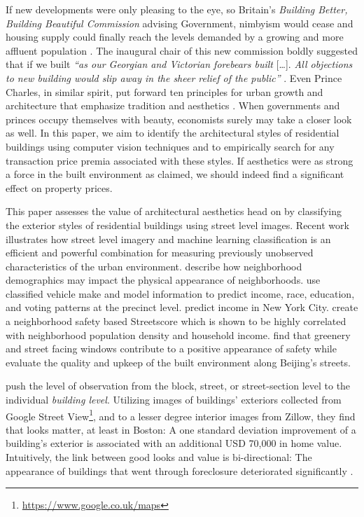 \documentclass[]{article}
\begin{document}
If new developments were only pleasing to the eye, so Britain's
\emph{Building Better, Building Beautiful Commission} advising
Government, nimbyism would cease and housing supply could finally reach
the levels demanded by a growing and more affluent population
\autocite{economistlineofbeauty2018}. The inaugural chair of this new
commission boldly suggested that if we built \emph{``as our Georgian and
Victorian forebears built} {[}\ldots{}{]}. \emph{All objections to new
building would slip away in the sheer relief of the public''}
\autocite{scruton2018}. Even Prince Charles, in similar spirit, put
forward ten principles for urban growth and architecture that emphasize
tradition and aesthetics \autocite{princecharles2014}. When governments
and princes occupy themselves with beauty, economists surely may take a
closer look as well. In this paper, we aim to identify the architectural
styles of residential buildings using computer vision techniques and to
empirically search for any transaction price premia associated with
these styles. If aesthetics were as strong a force in the built
environment as claimed, we should indeed find a significant effect on
property prices.

This paper assesses the value of architectural aesthetics head on by
classifying the exterior styles of residential buildings using street
level images. Recent work illustrates how street level imagery and
machine learning classification is an efficient and powerful combination
for measuring previously unobserved characteristics of the urban
environment. \textcite{Naik2017} describe how neighborhood demographics
may impact the physical appearance of neighborhoods.
\textcite{Gebru2017} use classified vehicle make and model information
to predict income, race, education, and voting patterns at the precinct
level. \textcite{Glaeser2016} predict income in New York City.
\textcite{Naik2016AER} create a neighborhood safety based Streetscore
which is shown to be highly correlated with neighborhood population
density and household income. \textcite{Nadai2016} find that greenery
and street facing windows contribute to a positive appearance of safety
while \textcite{Liu2017} evaluate the quality and upkeep of the built
environment along Beijing's streets.

\textcite{GlaeserKincaidNaik2018} push the level of observation from the
block, street, or street-section level to the individual
\emph{building level}. Utilizing images of buildings' exteriors
collected from Google Street
View\footnote{\href{https://www.google.co.uk/maps}{https://www.google.co.uk/maps}},
and to a lesser degree interior images from Zillow, they find that looks
matter, at least in Boston: A one standard deviation improvement of a
building's exterior is associated with an additional USD 70,000 in home
value. Intuitively, the link between good looks and value is
bi-directional: The appearance of buildings that went through
foreclosure deteriorated significantly
\autocite{GlaeserKincaidNaik2018}.
\end{document}
